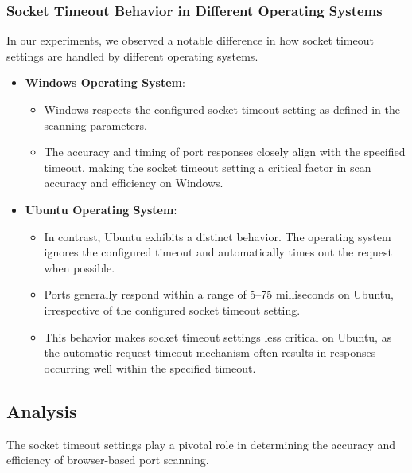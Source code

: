 \subsubsection{Socket Timeout Behavior in Different Operating Systems}
\label{section:socket-timeout-comparison}

In our experiments, we observed a notable difference in how socket timeout settings are handled by different operating systems.

\begin{itemize}
    \item \textbf{Windows Operating System}:
    \begin{itemize}
        \item Windows respects the configured socket timeout setting as defined in the scanning parameters.
        \item The accuracy and timing of port responses closely align with the specified timeout, making the socket timeout setting a critical factor in scan accuracy and efficiency on Windows.
    \end{itemize}
    
    \item \textbf{Ubuntu Operating System}:
    \begin{itemize}
        \item In contrast, Ubuntu exhibits a distinct behavior. The operating system ignores the configured timeout and automatically times out the request when possible.
        \item Ports generally respond within a range of 5--75 milliseconds on Ubuntu, irrespective of the configured socket timeout setting.
        \item This behavior makes socket timeout settings less critical on Ubuntu, as the automatic request timeout mechanism often results in responses occurring well within the specified timeout.
    \end{itemize}
\end{itemize}


\subsection{Analysis}

The socket timeout settings play a pivotal role in determining the accuracy and efficiency of browser-based port scanning.

